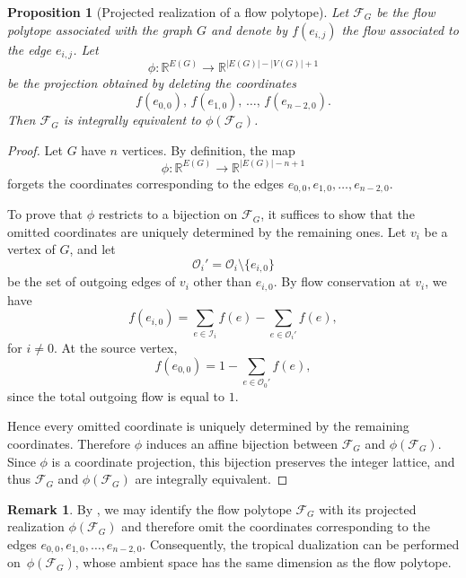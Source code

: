 \documentclass[12pt, reqno]{amsart}
\theoremstyle{plain}
\newtheorem{proposition}[theorem]{Proposition}
\theoremstyle{definition}
\newtheorem{remark}[theorem]{Remark}
\numberwithin{equation}{section}
\begin{document}
\begin{proposition}[Projected realization of a flow polytope]
\label{prop: projection_flowpolytopes}
Let $\mathcal{F}_G$ be the flow polytope associated with the graph $G$ and denote by $f(e_{i,j})$ the flow associated to the edge $e_{i,j}$. Let
\[
\phi:\mathbb{R}^{E(G)}
\longrightarrow
\mathbb{R}^{|E(G)|-|V(G)|+1}
\]
be the projection obtained by deleting the coordinates
\[
f(e_{0,0}),\,f(e_{1,0}),\,\ldots,\,f(e_{n-2,0}).
\]
Then $\mathcal{F}_G$ is integrally equivalent to $\phi(\mathcal{F}_G)$.
\end{proposition}





\begin{proof}
Let $G$ have $n$ vertices. By definition, the map
\[
\phi:\mathbb{R}^{E(G)}
\longrightarrow
\mathbb{R}^{|E(G)|-n+1}
\]
forgets the coordinates corresponding to the edges $e_{0,0},e_{1,0},\ldots,e_{n-2,0}$.

To prove that $\phi$ restricts to a bijection on $\mathcal{F}_G$, it suffices to show that the omitted coordinates are uniquely determined by the remaining ones. Let $v_i$ be a vertex of $G$, and let
\[
\mathcal{O}_i'=\mathcal{O}_i\setminus\{e_{i,0}\}
\]
be the set of outgoing edges of $v_i$ other than $e_{i,0}$. By flow conservation at $v_i$, we have
\[
f(e_{i,0}) = \sum_{e\in\mathcal{I}_i}f(e) - \sum_{e\in\mathcal{O}_i'}f(e),
\]
for $i\neq 0$. At the source vertex,
\[
f(e_{0,0}) = 1-\sum_{e\in\mathcal{O}_0'}f(e),
\]
since the total outgoing flow is equal to $1$.

Hence every omitted coordinate is uniquely determined by the remaining coordinates. Therefore $\phi$ induces an affine bijection between $\mathcal{F}_G$ and $\phi(\mathcal{F}_G)$. Since $\phi$ is a coordinate projection, this bijection preserves the integer lattice, and thus $\mathcal{F}_G$ and $\phi(\mathcal{F}_G)$ are integrally equivalent.
\end{proof}

\begin{remark}
By , we may identify the flow polytope $\mathcal{F}_G$ with its projected realization $\phi(\mathcal{F}_G)$ and therefore omit the coordinates corresponding to the edges $e_{0,0},e_{1,0},\ldots,e_{n-2,0}$. Consequently, the tropical dualization can be performed on~$\phi(\mathcal{F}_G)$, whose ambient space has the same dimension as the flow polytope.
\end{remark}
\end{document}
